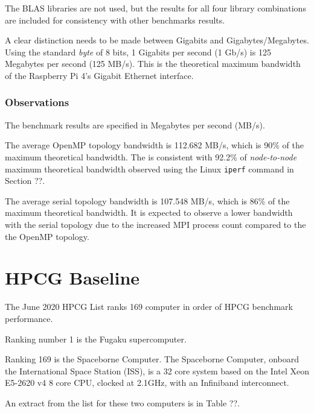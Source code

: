 The BLAS libraries are not used, but the results for all four library combinations are included for consistency with other benchmarks results.

A clear distinction needs to be made between Gigabits and Gigabytes/Megabytes. Using the standard \emph{byte} of 8 bits, 1 Gigabits per second (1 Gb/s) is 125 Megabytes per second (125 MB/s). This is the theoretical maximum bandwidth of the Raspberry Pi 4's Gigabit Ethernet interface.


\subsubsection{Observations}

The benchmark results are specified in Megabytes per second (MB/s).

The average OpenMP topology bandwidth is 112.682 MB/s, which is 90\% of the maximum theoretical bandwidth. The is consistent with 92.2\% of \emph{node-to-node} maximum theoretical bandwidth observed using the Linux \verb|iperf| command in Section ??.



The average serial topology bandwidth is 107.548 MB/s, which is 86\% of the maximum theoretical bandwidth. It is expected to observe a lower bandwidth with the serial topology due to the increased MPI process count compared to the the OpenMP topology. 



%
%
\section{HPCG Baseline}

The June 2020 HPCG List ranks 169 computer in order of HPCG benchmark performance.

Ranking number 1 is the Fugaku supercomputer.

Ranking 169 is the Spaceborne Computer. The Spaceborne Computer, onboard the International Space Station (ISS), is a 32 core system based on the Intel Xeon E5-2620 v4 8 core CPU, clocked at 2.1GHz, with an Infiniband interconnect.

An extract from the list for these two computers is in Table ??.

